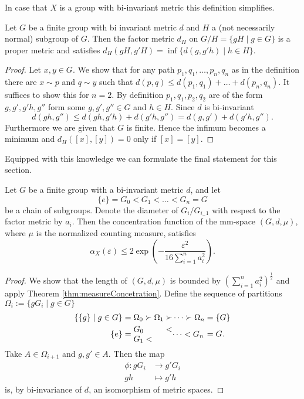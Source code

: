 In case that $X$ is a group with bi-invariant metric this definition simplifies.
\begin{lemma}
Let $G$ be a finite group with bi invariant metric $d$ and $H$ a (not necessarily normal) subgroup of $G$. Then the factor metric $d_H$ on $G/H=\{gH\mid g\in G\}$ is a proper metric and satisfies $d_H(gH,g'H)=\inf\{d(g,g'h)\mid h\in H\}$.
\end{lemma}
\begin{proof}
Let $x,y\in G$. We show that for any path $p_1,q_1,\dots,p_n,q_n$ as in the definition there are $x\sim p$ and $q\sim y$ such that $d(p,q)\leq d(p_1,q_1)+\dots+d(p_n,q_n)$. It suffices to show this for $n=2$. 
By definition $p_1,q_1,p_2,q_2$ are of the form $g,g',g'h,g''$ form some $g,g',g''\in G$ and $h\in H$. Since $d$ is bi-invariant 
\[d(gh,g'')\leq d(gh,g'h)+d(g'h,g'')=d(g,g')+d(g'h,g'').\]
Furthermore we are given that $G$ is finite. Hence the infimum becomes a minimum and $d_H([x],[y])=0$ only if $[x]=[y]$.
\end{proof}

Equipped with this knowledge we can formulate the final statement for this section. 
\begin{corollary}
Let $G$ be a finite group with a bi-invariant metric $d$, and let
\[\{e\}=G_0<G_1<\dots <G_n=G\]
be a chain of subgroups. Denote the diameter of $G_i/G_{i_-1}$ with respect to the factor metric by $a_i$. Then the concentration function of the mm-space $(G,d,\mu)$, where $\mu$ is the normalized counting measure, satisfies
\[\alpha_X(\varepsilon)\leq 2\exp\left(-\frac{\varepsilon^2}{16\sum_{i=1}^{n}a_i^2}\right).\]
\end{corollary}
\begin{proof}
We show that the length of $(G,d,\mu)$ is bounded by $\left(\sum_{i=1}^{n}a_i^2\right)^{\frac{1}{2}}$ and apply Theorem \ref{thm:measureConcetration}. Define the sequence of partitions $\Omega_i:=\{g G_i\mid g\in G\}$
\begin{align*}
\{\{g\}\mid g\in G\}=\Omega_0\succ\Omega_1\succ&\dots\succ\Omega_n=\{G\}\\
\{e\}=\parbox{\widthof{$\Omega_0\succ\Omega_1\succ$}}{$G_0<G_1<$}&\parbox{\widthof{${}\dots\succ\Omega_n$}}{$\dots <G_n$}=G.
\end{align*}
Take $A\in \Omega_{i+1}$ and $g,g'\in A$. Then the map
\begin{align*}
\phi\colon g G_i&{}\to g'G_i\\
gh&{}\mapsto g'h
\end{align*}
is, by bi-invariance of $d$, an isomorphism of metric spaces.
\end{proof}


